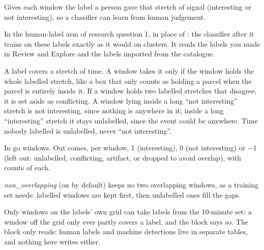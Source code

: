 Gives each window the label a person gave that stretch of signal (interesting or not
interesting), so a classifier can learn from human judgement.

In the human-label arm of research question 1, in place of : the
classifier after it trains on these labels exactly as it would on clusters. It reads the labels
you made in Review and Explore and the labels imported from the catalogue.

\begin{plainterms}
A label covers a stretch of time. A window takes it only if the window holds the whole labelled
stretch, like a box that only counts as holding a parcel when the parcel is entirely inside it.
If a window holds two labelled stretches that disagree, it is set aside as conflicting. A window
lying inside a long ``not interesting'' stretch is not interesting, since nothing is anywhere in
it; inside a long ``interesting'' stretch it stays unlabelled, since the event could be anywhere.
Time nobody labelled is unlabelled, never ``not interesting''.
\end{plainterms}

In go windows. Out comes, per window, 1 (interesting), 0 (not interesting) or $-1$ (left out:
unlabelled, conflicting, artifact, or dropped to avoid overlap), with counts of each.

\emph{non\_overlapping} (on by default) keeps no two overlapping windows, as a training set
needs: labelled windows are kept first, then unlabelled ones fill the gaps.

Only windows on the labels' own grid can take labels from the 10-minute set: a window off the
grid only ever partly covers a label, and the block says so. The block only reads: human labels
and machine detections live in separate tables, and nothing here writes either.
